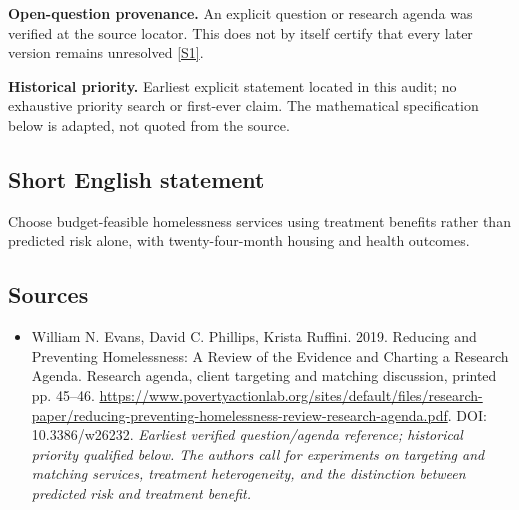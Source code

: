 \documentclass[11pt]{article}
\newcommand{\sref}[2]{\hyperlink{source:#1:#2}{[S#2]}}
\begin{document}
\par\textbf{Open-question provenance.} An explicit question or research agenda was verified at the source locator. This does not by itself certify that every later version remains unresolved \sref{30007751}{1}.

\par\textbf{Historical priority.} Earliest explicit statement located in this audit; no exhaustive priority search or first-ever claim. The mathematical specification below is adapted, not quoted from the source.

\subsection{Short English statement}
Choose budget-feasible homelessness services using treatment benefits rather than predicted risk alone, with twenty-four-month housing and health outcomes.

\subsection{Sources}
\begin{itemize}\raggedright
\item[\textnormal{[S1]}]\hypertarget{source:30007751:1}{} William N. Evans, David C. Phillips, Krista Ruffini. 2019. Reducing and Preventing Homelessness: A Review of the Evidence and Charting a Research Agenda. Research agenda, client targeting and matching discussion, printed pp. 45–46.
\url{https://www.povertyactionlab.org/sites/default/files/research-paper/reducing-preventing-homelessness-review-research-agenda.pdf}.
DOI: 10.3386/w26232.
{\small\textit{Earliest verified question/agenda reference; historical priority qualified below. The authors call for experiments on targeting and matching services, treatment heterogeneity, and the distinction between predicted risk and treatment benefit.}}
\end{itemize}
\end{document}
